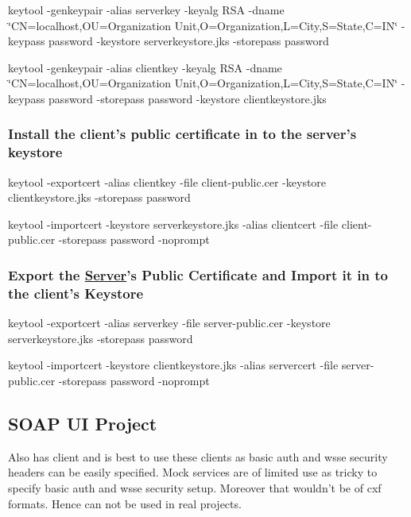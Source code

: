 \begin{DoxyItemize}
\item keytool -\/genkeypair -\/alias serverkey -\/keyalg R\+S\+A -\/dname \char`\"{}\+C\+N=localhost,\+O\+U=\+Organization Unit,\+O=\+Organization,\+L=\+City,\+S=\+State,\+C=\+I\+N\char`\"{} -\/keypass password -\/keystore serverkeystore.\+jks -\/storepass password 
\item keytool -\/genkeypair -\/alias clientkey -\/keyalg R\+S\+A -\/dname \char`\"{}\+C\+N=localhost,\+O\+U=\+Organization Unit,\+O=\+Organization,\+L=\+City,\+S=\+State,\+C=\+I\+N\char`\"{} -\/keypass password -\/storepass password -\/keystore clientkeystore.\+jks 
\end{DoxyItemize}\subsubsection*{Install the client's public certificate in to the server's keystore}


\begin{DoxyItemize}
\item keytool -\/exportcert -\/alias clientkey -\/file client-\/public.\+cer -\/keystore clientkeystore.\+jks -\/storepass password 
\item keytool -\/importcert -\/keystore serverkeystore.\+jks -\/alias clientcert -\/file client-\/public.\+cer -\/storepass password -\/noprompt 
\end{DoxyItemize}

\subsubsection*{Export the \hyperlink{classcom_1_1freemindcafe_1_1apache_1_1cxf_1_1wsdl_1_1_server}{Server}'s Public Certificate and Import it in to the client's Keystore}


\begin{DoxyItemize}
\item keytool -\/exportcert -\/alias serverkey -\/file server-\/public.\+cer -\/keystore serverkeystore.\+jks -\/storepass password 
\item keytool -\/importcert -\/keystore clientkeystore.\+jks -\/alias servercert -\/file server-\/public.\+cer -\/storepass password -\/noprompt 
\end{DoxyItemize}

\subsection*{S\+O\+A\+P U\+I Project}


\begin{DoxyPre}
    Also has client and is best to use these clients as basic auth and wsse security headers can be easily specified.
    Mock services are of limited use as tricky to specify basic auth and wsse security setup. Moreover that wouldn't be of cxf formats. Hence can not be used in real projects.
\end{DoxyPre}
 